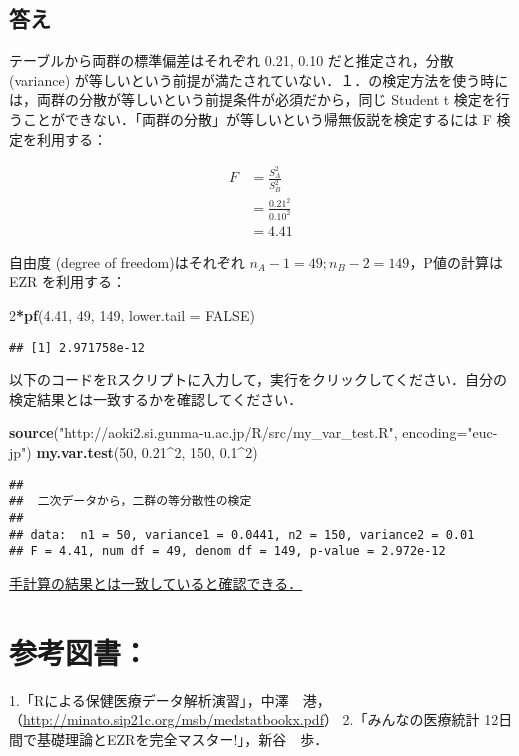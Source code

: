 \documentclass[11pt,]{problemset}
\newenvironment{Shaded}{\begin{snugshade}}{\end{snugshade}}
\newcommand{\DataTypeTok}[1]{\textcolor[rgb]{0.13,0.29,0.53}{#1}}
\newcommand{\DecValTok}[1]{\textcolor[rgb]{0.00,0.00,0.81}{#1}}
\newcommand{\FloatTok}[1]{\textcolor[rgb]{0.00,0.00,0.81}{#1}}
\newcommand{\KeywordTok}[1]{\textcolor[rgb]{0.13,0.29,0.53}{\textbf{#1}}}
\newcommand{\NormalTok}[1]{#1}
\newcommand{\OperatorTok}[1]{\textcolor[rgb]{0.81,0.36,0.00}{\textbf{#1}}}
\newcommand{\OtherTok}[1]{\textcolor[rgb]{0.56,0.35,0.01}{#1}}
\newcommand{\StringTok}[1]{\textcolor[rgb]{0.31,0.60,0.02}{#1}}
\begin{document}
\hypertarget{-1}{%
\subsection{答え}\label{-1}}

テーブルから両群の標準偏差はそれぞれ 0.21, 0.10 だと推定され，分散
(variance)
が等しいという前提が満たされていない．１．の検定方法を使う時には，両群の分散が等しいという前提条件が必須だから，同じ
Student t
検定を行うことができない．「両群の分散」が等しいという帰無仮説を検定するには
F 検定を利用する：

\[
\begin{aligned}
F & = \frac{S^2_A}{S^2_B} \\
  & = \frac{0.21^2}{0.10^2} \\
  & = 4.41
\end{aligned}
\]

自由度 (degree of freedom)はそれぞれ
\(n_A - 1 = 49; n_B -2 = 149\)，P値の計算は EZR を利用する：

\begin{Shaded}
\begin{Highlighting}[]
\DecValTok{2}\OperatorTok{*}\KeywordTok{pf}\NormalTok{(}\FloatTok{4.41}\NormalTok{, }\DecValTok{49}\NormalTok{, }\DecValTok{149}\NormalTok{, }\DataTypeTok{lower.tail =} \OtherTok{FALSE}\NormalTok{)}
\end{Highlighting}
\end{Shaded}

\begin{verbatim}
## [1] 2.971758e-12
\end{verbatim}

\bigskip

以下のコードをRスクリプトに入力して，実行をクリックしてください．自分の検定結果とは一致するかを確認してください．

\begin{Shaded}
\begin{Highlighting}[]
\KeywordTok{source}\NormalTok{(}\StringTok{"http://aoki2.si.gunma-u.ac.jp/R/src/my_var_test.R"}\NormalTok{, }\DataTypeTok{encoding=}\StringTok{"euc-jp"}\NormalTok{)}
\KeywordTok{my.var.test}\NormalTok{(}\DecValTok{50}\NormalTok{, }\FloatTok{0.21}\OperatorTok{^}\DecValTok{2}\NormalTok{, }\DecValTok{150}\NormalTok{, }\FloatTok{0.1}\OperatorTok{^}\DecValTok{2}\NormalTok{)}
\end{Highlighting}
\end{Shaded}

\begin{verbatim}
## 
##  二次データから，二群の等分散性の検定
## 
## data:  n1 = 50, variance1 = 0.0441, n2 = 150, variance2 = 0.01
## F = 4.41, num df = 49, denom df = 149, p-value = 2.972e-12
\end{verbatim}

\underline{手計算の結果とは一致していると確認できる．}

\newpage
\vfill

\section{参考図書：}

1.「Rによる保健医療データ解析演習」，中澤　港，（\url{http://minato.sip21c.org/msb/medstatbookx.pdf}）
2.「みんなの医療統計 12日間で基礎理論とEZRを完全マスター!」，新谷　歩．
\end{document}
